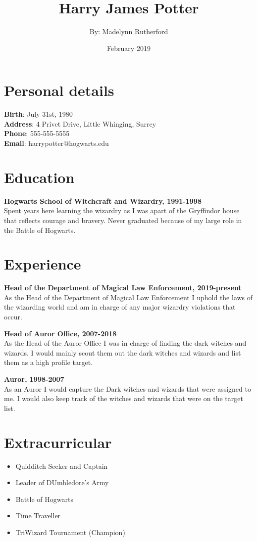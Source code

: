 \documentclass[12pt, letterpaper, twoside] {article}
\title{Harry James Potter}
\author{By: Madelynn Rutherford}
\date{February 2019}
\begin{document}
\maketitle

\section{Personal details}

\textbf{Birth}: July 31st, 1980\\
\textbf{Address}: 4 Privet Drive, Little Whinging, Surrey\\
\textbf{Phone}: 555-555-5555\\
\textbf{Email}: harrypotter@hogwarts.edu\\

\section{Education}

\textbf{Hogwarts School of Witchcraft and Wizardry, 1991-1998}\\
Spent years here learning the wizardry as I was apart of the Gryffindor house that reflects courage and bravery. Never graduated because of my large role in the Battle of Hogwarts.

\section{Experience}

\textbf{Head of the Department of Magical Law Enforcement, 2019-present}\\
As the Head of the Department of Magical Law Enforcement I uphold the laws of the wizarding world and am in charge of any major wizardry violations that occur.

\textbf{Head of Auror Office, 2007-2018}\\
As the Head of the Auror Office I was in charge of finding the dark witches and wizards. I would mainly scout them out the dark witches and wizards and list them as a high profile target.

\textbf{Auror, 1998-2007}\\
As an Auror I would capture the Dark witches and wizards that were assigned to me. I would also keep track of the witches and wizards that were on the target list.\\

\section{Extracurricular}
 \begin{itemize}
     \item Quidditch Seeker and Captain
     \item Leader of DUmbledore's Army
     \item Battle of Hogwarts
     \item Time Traveller
     \item TriWizard Tournament (Champion)
 \end{itemize}
\end{document}
